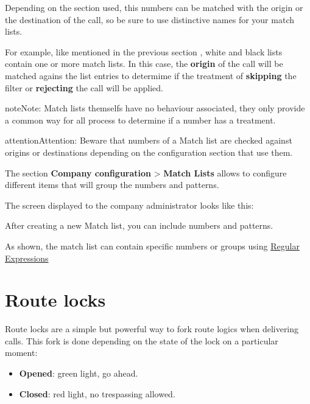 \documentclass[letterpaper,10pt,english]{sphinxmanual}
\begin{document}
Depending on the section used, this numbers can be matched with the origin or
the destination of the call, so be sure to use distinctive names for your match
lists.

For example, like mentioned in the previous section {\hyperref[pbx_features/external_filters:external\string-filters]{}},
white and black lists contain one or more match lists. In this case, the
\textbf{origin} of the call will be matched agains the list entries to determime if
the treatment of \textbf{skipping} the filter or \textbf{rejecting} the call will be applied.

\begin{notice}{note}{Note:}
Match lists themselfs have no behaviour associated, they only provide
a common way for all process to determine if a number has a treatment.
\end{notice}

\begin{notice}{attention}{Attention:}
Beware that numbers of a Match list are checked against origins
or destinations depending on the configuration section that use them.
\end{notice}

The section \textbf{Company configuration} \textgreater{} \textbf{Match Lists} allows to configure
different items that will group the numbers and patterns.

The screen displayed to the company administrator looks like this:


After creating a new Match list, you can include numbers and patterns.


As shown, the match list can contain specific numbers or groups using
\href{http://php.net/manual/en/reference.pcre.pattern.syntax.php}{Regular Expressions}


\section{Route locks}
\label{pbx_features/route_locks:id1}\label{pbx_features/route_locks::doc}\label{pbx_features/route_locks:route-locks}
Route locks are a simple but powerful way to fork route logics when delivering calls. This fork is done depending on the
state of the lock on a particular moment:
\begin{itemize}
\item {} 
\textbf{Opened}: green light, go ahead.

\item {} 
\textbf{Closed}: red light, no trespassing allowed.

\end{itemize}
\end{document}
